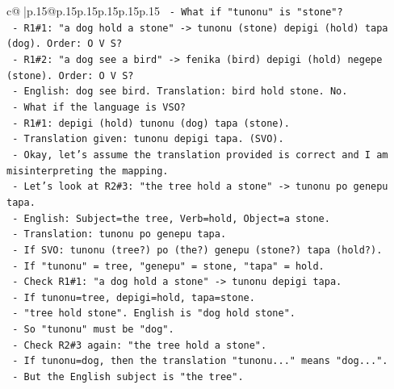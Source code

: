 \documentclass{article}
\begin{document}
{\begin{supertabular}{c@{$\;$}|p{.15\linewidth}@{}p{.15\linewidth}p{.15\linewidth}p{.15\linewidth}p{.15\linewidth}p{.15\linewidth}}
{{{\texttt{                  {-} What if "tunonu" is "stone"?} \\
\texttt{                    {-} R1\#1: "a dog hold a stone" {-}> tunonu (stone) depigi (hold) tapa (dog). Order: O V S?} \\
\texttt{                    {-} R1\#2: "a dog see a bird" {-}> fenika (bird) depigi (hold) negepe (stone). Order: O V S?} \\
\texttt{                      {-} English: dog see bird. Translation: bird hold stone. No.} \\
\texttt{                  {-} What if the language is VSO?} \\
\texttt{                    {-} R1\#1: depigi (hold) tunonu (dog) tapa (stone).} \\
\texttt{                      {-} Translation given: tunonu depigi tapa. (SVO).} \\
\texttt{                  {-} Okay, let's assume the translation provided is correct and I am misinterpreting the mapping.} \\
\texttt{                  {-} Let's look at R2\#3: "the tree hold a stone" {-}> tunonu po genepu tapa.} \\
\texttt{                    {-} English: Subject=the tree, Verb=hold, Object=a stone.} \\
\texttt{                    {-} Translation: tunonu po genepu tapa.} \\
\texttt{                    {-} If SVO: tunonu (tree?) po (the?) genepu (stone?) tapa (hold?).} \\
\texttt{                    {-} If "tunonu" = tree, "genepu" = stone, "tapa" = hold.} \\
\texttt{                    {-} Check R1\#1: "a dog hold a stone" {-}> tunonu depigi tapa.} \\
\texttt{                      {-} If tunonu=tree, depigi=hold, tapa=stone.} \\
\texttt{                      {-} "tree hold stone". English is "dog hold stone".} \\
\texttt{                      {-} So "tunonu" must be "dog".} \\
\texttt{                    {-} Check R2\#3 again: "the tree hold a stone".} \\
\texttt{                      {-} If tunonu=dog, then the translation "tunonu..." means "dog...".} \\
\texttt{                      {-} But the English subject is "the tree".} \\
}}}
\end{supertabular}}
\end{document}
